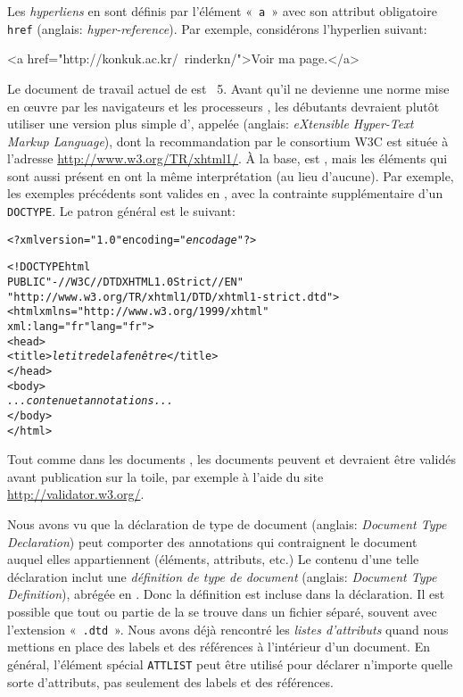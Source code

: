 Les \emph{hyperliens} en \HTML sont définis par l'élément «~\texttt{a}~»
avec son attribut obligatoire \texttt{href}
(anglais: \emph{hyper-reference}). Par exemple, considérons
l'hyperlien suivant:
\begin{sverb}
<a href="http://konkuk.ac.kr/~rinderkn/">Voir ma page.</a>
\end{sverb}


\mypar{\XHTML}

Le document de travail actuel de \HTML est \HTML~\textsf{5}. Avant
qu'il ne devienne une norme mise en œuvre par les navigateurs et
les processeurs \XSLT, les débutants devraient plutôt utiliser une
version plus simple d'\HTML, appelée \XHTML (anglais: \emph{eXtensible
  Hyper-Text Markup Language}), dont la recommandation par le
consortium W3C est située à l'adresse
\url{http://www.w3.org/TR/xhtml1/}. À la base, \XHTML est \XML, mais
les éléments qui sont aussi présent en \HTML ont la même
interprétation (au lieu d'aucune). Par exemple, les exemples
précédents sont valides en \XHTML, avec la contrainte supplémentaire
d'un \texttt{DOCTYPE}. Le patron général est le suivant:
\begin{alltt}
\small<?xml version="1.0" encoding="\emph{encodage}"?>

<!DOCTYPE html
    PUBLIC "-//W3C//DTD XHTML 1.0 Strict//EN"
    "http://www.w3.org/TR/xhtml1/DTD/xhtml1-strict.dtd">
<html xmlns="http://www.w3.org/1999/xhtml"
      xml:lang="fr" lang="fr">
  <head>
    <title>\textit{le titre de la fenêtre}</title>
  </head>
  <body>
     \emph{...contenu et annotations...}
  </body>
</html>
\end{alltt}
Tout comme dans les documents \XML, les documents \XHTML peuvent et
devraient être validés avant publication sur la toile, par exemple à
l'aide du site \url{http://validator.w3.org/}.

\mypar{\DTD}

Nous avons vu  que la déclaration de type
de document (anglais: \emph{Document Type Declaration}) peut comporter
des annotations qui contraignent le document \XML auquel elles
appartiennent (éléments, attributs, etc.) Le contenu d'une telle
déclaration inclut une \emph{définition de type de document} (anglais:
\emph{Document Type Definition}), abrégée en \DTD. Donc la définition
est incluse dans la déclaration. Il est possible que tout ou partie de
la \DTD se trouve dans un fichier séparé, souvent avec l'extension
«~\texttt{.dtd}~». Nous avons déjà rencontré les \emph{listes
  d'attributs}  quand nous mettions en
place des labels et des références à l'intérieur d'un document. En
général, l'élément spécial \texttt{ATTLIST} peut être utilisé pour
déclarer n'importe quelle sorte d'attributs, pas seulement des labels
et des références.

